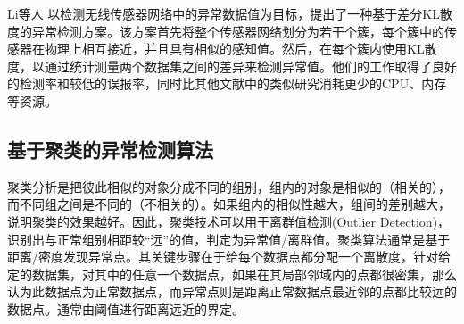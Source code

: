 Li等人\cite{li2012differential} 以检测无线传感器网络中的异常数据值为目标，提出了一种基于差分KL散度的异常检测方案。该方案首先将整个传感器网络划分为若干个簇，每个簇中的传感器在物理上相互接近，并且具有相似的感知值。然后，在每个簇内使用KL散度，以通过统计测量两个数据集之间的差异来检测异常值。他们的工作取得了良好的检测率和较低的误报率，同时比其他文献中的类似研究消耗更少的CPU、内存等资源。










\subsection{基于聚类的异常检测算法}

聚类分析是把彼此相似的对象分成不同的组别，组内的对象是相似的（相关的），而不同组之间是不同的（不相关的）。如果组内的相似性越大，组间的差别越大，说明聚类的效果越好。因此，聚类技术可以用于离群值检测(Outlier Detection)，识别出与正常组别相距较“远”的值，判定为异常值/离群值\cite{2012Cluster}。聚类算法通常是基于距离/密度发现异常点。其关键步骤在于给每个数据点都分配一个离散度，针对给定的数据集，对其中的任意一个数据点，如果在其局部邻域内的点都很密集，那么认为此数据点为正常数据点，而异常点则是距离正常数据点最近邻的点都比较远的数据点。通常由阈值进行距离远近的界定。


